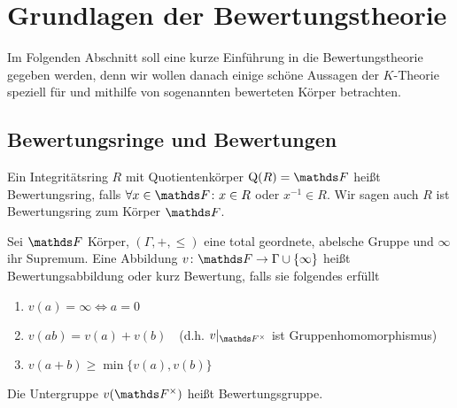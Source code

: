 \documentclass[ngerman,fontsize=11pt, paper=a4, parskip=half, titlepage=true, toc=bib]{scrartcl}
\begin{document}

\section{Grundlagen der Bewertungstheorie}

Im Folgenden Abschnitt soll eine kurze Einführung in die
Bewertungstheorie gegeben werden, denn wir wollen danach einige schöne
Aussagen der $K$-Theorie speziell für und mithilfe von sogenannten
bewerteten Körper betrachten.

\subsection{Bewertungsringe und Bewertungen}

\begin{Def}[Bewertungsring]\label{defbewertungsring}
  Ein Integritätsring $R$ mit Quotientenkörper $\Quot(R)=\F$ heißt
  Bewertungsring, falls $\forall x\in\F\colon x\in R$ oder
  $x^{-1}\in R$.
  Wir sagen auch $R$ ist Bewertungsring zum Körper $\F$.
\end{Def}

\begin{Def}[Bewertung]
  Sei $\F$ Körper, $(\Gamma,+,\leq)$ eine total geordnete, abelsche
  Gruppe und $\infty$ ihr Supremum.
  Eine Abbildung $v\colon\F\to\Gamma\cup\{\infty\}$
  heißt Bewertungsabbildung oder kurz Bewertung,
  falls sie folgendes erfüllt
  \begin{enumerate}[(1)]
  \item $v(a)=\infty \Longleftrightarrow a=0$
  \item $v(ab)=v(a)+v(b)$~~(d.h. $v|_{\Fx}$ ist Gruppenhomomorphismus)
  \item $v(a+b)\geq \min\{v(a),v(b)\}$
  \end{enumerate}
  Die Untergruppe $v(\Fx)$ heißt Bewertungsgruppe.
\end{Def}
\end{document}
